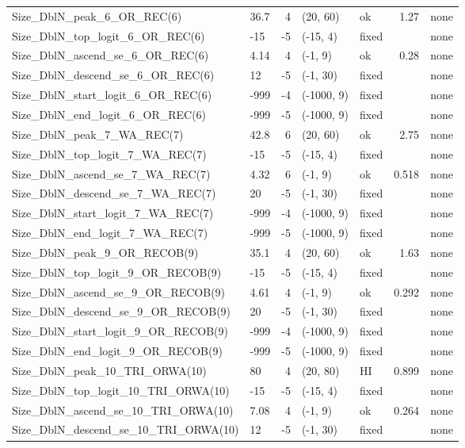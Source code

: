 \documentclass[
  english,
]{article}
\begin{document}
\begin{landscape}
\begin{longtable}{llrllrl}
Size\_DblN\_peak\_6\_OR\_REC(6) & 36.7 & 4 & (20, 60) & ok & 1.27 & none \\ 
Size\_DblN\_top\_logit\_6\_OR\_REC(6) & -15 & -5 & (-15, 4) & fixed &  & none \\ 
Size\_DblN\_ascend\_se\_6\_OR\_REC(6) & 4.14 & 4 & (-1, 9) & ok & 0.28 & none \\ 
Size\_DblN\_descend\_se\_6\_OR\_REC(6) & 12 & -5 & (-1, 30) & fixed &  & none \\ 
Size\_DblN\_start\_logit\_6\_OR\_REC(6) & -999 & -4 & (-1000, 9) & fixed &  & none \\ 
Size\_DblN\_end\_logit\_6\_OR\_REC(6) & -999 & -5 & (-1000, 9) & fixed &  & none \\ 
Size\_DblN\_peak\_7\_WA\_REC(7) & 42.8 & 6 & (20, 60) & ok & 2.75 & none \\ 
Size\_DblN\_top\_logit\_7\_WA\_REC(7) & -15 & -5 & (-15, 4) & fixed &  & none \\ 
Size\_DblN\_ascend\_se\_7\_WA\_REC(7) & 4.32 & 6 & (-1, 9) & ok & 0.518 & none \\ 
Size\_DblN\_descend\_se\_7\_WA\_REC(7) & 20 & -5 & (-1, 30) & fixed &  & none \\ 
Size\_DblN\_start\_logit\_7\_WA\_REC(7) & -999 & -4 & (-1000, 9) & fixed &  & none \\ 
Size\_DblN\_end\_logit\_7\_WA\_REC(7) & -999 & -5 & (-1000, 9) & fixed &  & none \\ 
Size\_DblN\_peak\_9\_OR\_RECOB(9) & 35.1 & 4 & (20, 60) & ok & 1.63 & none \\ 
Size\_DblN\_top\_logit\_9\_OR\_RECOB(9) & -15 & -5 & (-15, 4) & fixed &  & none \\ 
Size\_DblN\_ascend\_se\_9\_OR\_RECOB(9) & 4.61 & 4 & (-1, 9) & ok & 0.292 & none \\ 
Size\_DblN\_descend\_se\_9\_OR\_RECOB(9) & 20 & -5 & (-1, 30) & fixed &  & none \\ 
Size\_DblN\_start\_logit\_9\_OR\_RECOB(9) & -999 & -4 & (-1000, 9) & fixed &  & none \\ 
Size\_DblN\_end\_logit\_9\_OR\_RECOB(9) & -999 & -5 & (-1000, 9) & fixed &  & none \\ 
Size\_DblN\_peak\_10\_TRI\_ORWA(10) & 80 & 4 & (20, 80) & HI & 0.899 & none \\ 
Size\_DblN\_top\_logit\_10\_TRI\_ORWA(10) & -15 & -5 & (-15, 4) & fixed &  & none \\ 
Size\_DblN\_ascend\_se\_10\_TRI\_ORWA(10) & 7.08 & 4 & (-1, 9) & ok & 0.264 & none \\ 
Size\_DblN\_descend\_se\_10\_TRI\_ORWA(10) & 12 & -5 & (-1, 30) & fixed &  & none \\ 

\end{longtable}
\end{landscape}
\end{document}
